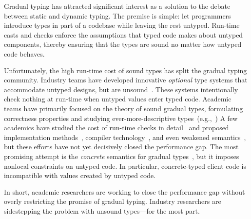 \documentclass[english,cleveref,submission]{programming}
\begin{document}
Gradual typing has attracted significant interest as a solution to
the debate between static and dynamic typing.
The premise is simple: let programmers introduce types in part of a
codebase while leaving the rest untyped.
Run-time casts and checks enforce the assumptions that typed code makes about
untyped components, thereby ensuring that the types are sound no matter how
untyped code behaves.

Unfortunately, the high run-time cost of sound types has split
the gradual typing community.
Industry teams have developed innovative \emph{optional} type systems that accommodate
untyped designs, but are unsound~\cite{bat-ecoop-2014,rch-popl-2012,cvgrl-oopsla-2017,pep484}.
These systems intentionally check nothing at run-time when untyped values enter
typed code.
Academic teams have primarily focused on the theory of sound
gradual types, formulating correctness properties and studying ever-more-descriptive
types~(e.g.,~\cite{sgt-jfp-2016,clps-popl-2019,nla-popl-2019,mgt-oopsla-2021})
A few academics have studied the cost of run-time checks
in detail~\cite{tfgnvf-popl-2016,gtnffvf-jfp-2019}
and proposed implementation methods~\cite{kas-pldi-2019,fgsfs-oopsla-2018},
compiler technology~\cite{vsc-dls-2019,bbst-oopsla-2017},
and even weakened semantics~\cite{glfd-pj-2022,vss-popl-2017,gi-scp-2020},
but these efforts have not yet decisively closed the performance gap.
The most promising attempt is the \emph{concrete\/} semantics
for gradual types~\cite{clzv-ecoop-2018,mt-oopsla-2017,wzlov-popl-2010}, but it imposes nonlocal
constraints on untyped code.
In particular, concrete-typed client code is incompatible with
values created by untyped code.

In short, academic researchers are working to close the performance gap
without overly restricting the promise of gradual typing.
Industry researchers are sidestepping the problem with unsound types---for the most part.
\end{document}

